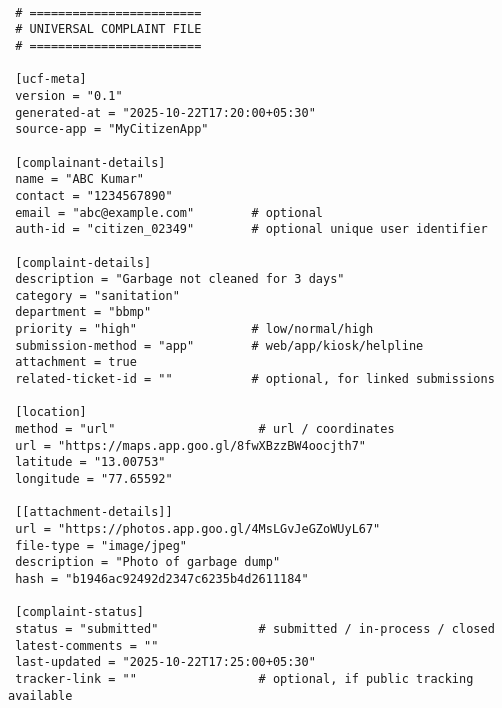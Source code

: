 
 \begin{verbatim}

 # ========================
 # UNIVERSAL COMPLAINT FILE
 # ========================

 [ucf-meta]
 version = "0.1"
 generated-at = "2025-10-22T17:20:00+05:30"
 source-app = "MyCitizenApp"

 [complainant-details]
 name = "ABC Kumar"
 contact = "1234567890"
 email = "abc@example.com"        # optional
 auth-id = "citizen_02349"        # optional unique user identifier

 [complaint-details]
 description = "Garbage not cleaned for 3 days"
 category = "sanitation"
 department = "bbmp"
 priority = "high"                # low/normal/high
 submission-method = "app"        # web/app/kiosk/helpline
 attachment = true
 related-ticket-id = ""           # optional, for linked submissions

 [location]
 method = "url"                    # url / coordinates
 url = "https://maps.app.goo.gl/8fwXBzzBW4oocjth7"
 latitude = "13.00753"
 longitude = "77.65592"

 [[attachment-details]]
 url = "https://photos.app.goo.gl/4MsLGvJeGZoWUyL67"
 file-type = "image/jpeg"
 description = "Photo of garbage dump"
 hash = "b1946ac92492d2347c6235b4d2611184"

 [complaint-status]
 status = "submitted"              # submitted / in-process / closed
 latest-comments = ""
 last-updated = "2025-10-22T17:25:00+05:30"
 tracker-link = ""                 # optional, if public tracking available
 
 \end{verbatim}
